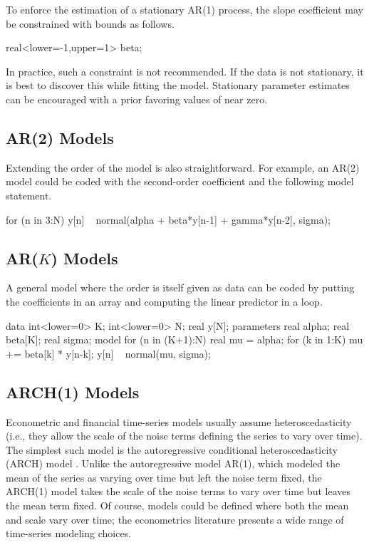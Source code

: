 To enforce the estimation of a stationary AR(1) process, the slope
coefficient  may be constrained with bounds as follows.
%
\begin{stancode}
real<lower=-1,upper=1> beta;
\end{stancode}
%
In practice, such a constraint is not recommended.  If the data is not
stationary, it is best to discover this while fitting the model.
Stationary parameter estimates can be encouraged with a prior favoring
values of  near zero.


\subsection{AR(2) Models}

Extending the order of the model is also straightforward.  For
example, an AR(2) model could be coded with the second-order
coefficient  and the following model statement.
%
\begin{stancode}
for (n in 3:N)
  y[n] ~ normal(alpha + beta*y[n-1] + gamma*y[n-2], sigma);
\end{stancode}


\subsection{AR($K$) Models}

A general model where the order is itself given as data can be coded
by putting the coefficients in an array and computing the linear
predictor in a loop.
%
\begin{stancode}
data {
  int<lower=0> K;
  int<lower=0> N;
  real y[N];
}
parameters {
  real alpha;
  real beta[K];
  real sigma;
}
model {
  for (n in (K+1):N) {
    real mu = alpha;
    for (k in 1:K)
      mu += beta[k] * y[n-k];
    y[n] ~ normal(mu, sigma);
  }
}
\end{stancode}

\subsection{ARCH(1) Models}

Econometric and financial time-series models usually assume
heteroscedasticity (i.e., they allow the scale of the noise terms
defining the series to vary over time).
The simplest such model is the autoregressive conditional
heteroscedasticity (ARCH) model \citep{Engle:1982}.  Unlike the
autoregressive model AR(1), which modeled the mean of the series as
varying over time but left the noise term fixed, the ARCH(1) model
takes the scale of the noise terms to vary over time but leaves the
mean term fixed.  Of course, models could be defined where both the
mean and scale vary over time; the econometrics literature presents a
wide range of time-series modeling choices.


